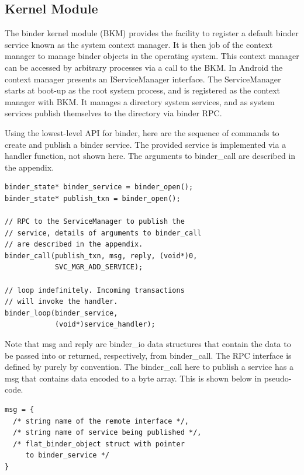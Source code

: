 \documentclass[prodmode]{acmlarge}
\begin{document}
\subsection{Kernel Module}
The binder kernel module (BKM) provides the facility to register a default binder service known as the system context manager. It is then job of the context manager to manage binder objects in the operating system. This context manager can be accessed by arbitrary processes via a call to the BKM. In Android the context manager presents an IServiceManager interface. The ServiceManager starts at boot-up as the root system process, and is registered as the context manager with BKM. It manages a directory system services, and as system services publish themselves to the directory via binder RPC.

Using the lowest-level API for binder, here are the sequence of commands to create and publish a binder service. The provided service is implemented via a handler function, not shown here. The arguments to binder\_call are described in the appendix.

\begin{Verbatim}[samepage=true]
binder_state* binder_service = binder_open();
binder_state* publish_txn = binder_open();

// RPC to the ServiceManager to publish the
// service, details of arguments to binder_call
// are described in the appendix.
binder_call(publish_txn, msg, reply, (void*)0,
            SVC_MGR_ADD_SERVICE);

// loop indefinitely. Incoming transactions
// will invoke the handler.
binder_loop(binder_service,
            (void*)service_handler);
\end{Verbatim}

Note that msg and reply are binder\_io data structures that contain the data to be passed into or returned, respectively, from binder\_call. The RPC interface is defined by purely by convention. The binder\_call here to publish a service has a msg that contains data encoded to a byte array. This is shown below in pseudo-code.

\begin{Verbatim}[samepage=true]
msg = {
  /* string name of the remote interface */,
  /* string name of service being published */,
  /* flat_binder_object struct with pointer
     to binder_service */
}
\end{Verbatim}
\end{document}
